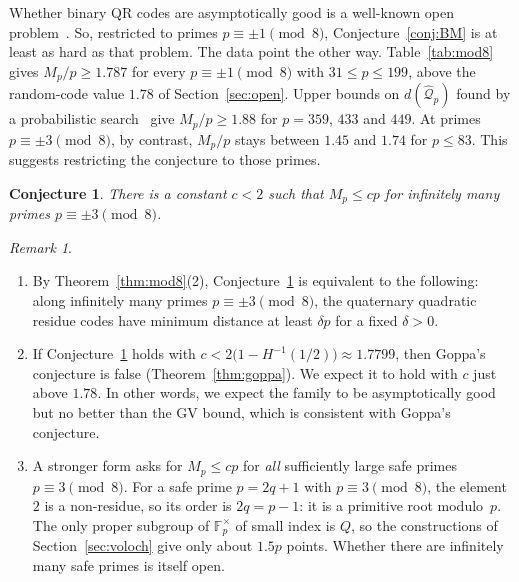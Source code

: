 \documentclass[12pt,letterpaper]{article}
\newtheorem{conjecture}[theorem]{Conjecture}
\theoremstyle{definition}
\theoremstyle{remark}
\newtheorem{remark}[theorem]{Remark}
\numberwithin{equation}{section}
\newcommand{\Fp}{\mathbb{F}_p}
\begin{document}
Whether binary QR codes are asymptotically good is a well-known open
problem~\cite{MS77,HP03}. So, restricted to primes $p\equiv\pm1\pmod8$,
Conjecture~\ref{conj:BM} is at least as hard as that problem. The data point the
other way. Table~\ref{tab:mod8} gives $M_p/p\ge1.787$ for every
$p\equiv\pm1\pmod 8$ with $31\le p\le199$, above the random-code value $1.78$ of
Section~\ref{sec:open}. Upper bounds on $d(\widehat{\mathcal Q}_p)$ found by a
probabilistic search~\cite[Table~9.5]{TTAAJ17} give $M_p/p\ge1.88$ for $p=359$, $433$
and $449$. At primes $p\equiv\pm3\pmod 8$, by contrast, $M_p/p$ stays between $1.45$
and $1.74$ for $p\le83$. This suggests restricting the conjecture to those primes.

\begin{conjecture}\label{conj:refined}
There is a constant $c<2$ such that $M_p\le cp$ for infinitely many primes
$p\equiv\pm3\pmod 8$.
\end{conjecture}

\begin{remark}\label{rem:refined}
\begin{enumerate}
\item By Theorem~\ref{thm:mod8}(2), Conjecture~\ref{conj:refined} is equivalent to
the following: along infinitely many primes $p\equiv\pm3\pmod8$, the quaternary
quadratic residue codes have minimum distance at least $\delta p$ for a fixed
$\delta>0$.
\item If Conjecture~\ref{conj:refined} holds with
$c<2\big(1-H^{-1}(1/2)\big)\approx1.7799$, then Goppa's conjecture is false
(Theorem~\ref{thm:goppa}). We expect it to hold with $c$ just above $1.78$. In other
words, we expect the family to be asymptotically good but no better than the GV
bound, which is consistent with Goppa's conjecture.
\item A stronger form asks for $M_p\le cp$ for \emph{all} sufficiently large safe
primes $p\equiv3\pmod8$. For a safe prime $p=2q+1$ with $p\equiv3\pmod8$, the
element $2$ is a non-residue, so its order is $2q=p-1$: it is a primitive root
modulo~$p$. The only proper subgroup of $\Fp^\times$ of small index is $Q$, so the
constructions of Section~\ref{sec:voloch} give only about $1.5p$ points. Whether
there are infinitely many safe primes is itself open.
\end{enumerate}
\end{remark}
\end{document}
